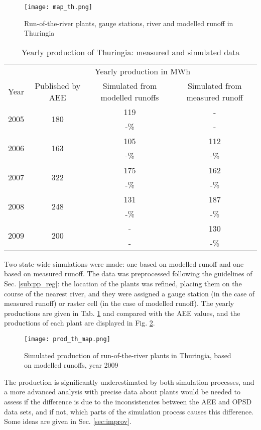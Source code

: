 \begin{figure}[H]
\centering
\texttt{[image: map\_th.png]}
\caption{Run-of-the-river plants, gauge stations, river and modelled runoff in Thuringia}
\label{map_th}
\end{figure}

\begin{table}[H]
\footnotesize
 \centering
 \caption{Yearly production of Thuringia: measured and simulated data}
 \label{res_th}
 \begin{tabular}{|l|ccc|}
 \hline
  &\multicolumn{3}{c|}{Yearly production in MWh}\\
  Year&Published by AEE&Simulated from modelled runoffs&Simulated from measured runoff\\
  \hline \hline
  \multirow{2}{*}{2005}&\multirow{2}{*}{180}&119&-\\
  &&-\unit[34]{\%}&-\\
  \hline
  \multirow{2}{*}{2006}&\multirow{2}{*}{163}&105&112\\
  &&-\unit[36]{\%}&-\unit[31]{\%}\\
  \hline
  \multirow{2}{*}{2007}&\multirow{2}{*}{322}&175&162\\
  &&-\unit[46]{\%}&-\unit[50]{\%}\\
  \hline
  \multirow{2}{*}{2008}&\multirow{2}{*}{248}&131&187\\
  &&-\unit[47]{\%}&-\unit[25]{\%}\\
  \hline
  \multirow{2}{*}{2009}&\multirow{2}{*}{200}&-&130\\
  &&-&-\unit[35]{\%}\\
  \hline
 \end{tabular}
\end{table}

Two state-wide simulations were made: one based on modelled runoff and one based on measured runoff. The data was preprocessed following the guidelines of Sec. \ref{sub:pp_reg}: the location of the plants was refined, placing them on the course of the nearest river, and they were assigned a gauge station (in the case of measured runoff) or raster cell (in the case of modelled runoff). The yearly productions are given in Tab. \ref{res_th} and compared with the AEE values, and the productions of each plant are displayed in Fig. \ref{prod_th_map}.

\begin{figure}[H]
\centering
\texttt{[image: prod\_th\_map.png]}
\caption{Simulated production of run-of-the-river plants in Thuringia, based on modelled runoffs, year 2009}
\label{prod_th_map}
\end{figure}
 
The production is significantly underestimated by both simulation processes, and a more advanced analysis with precise data about plants would be needed to assess if the difference is due to the inconsistencies between the AEE and OPSD data sets, and if not, which parts of the simulation process causes this difference. Some ideas are given in Sec. \ref{sec:improv}.